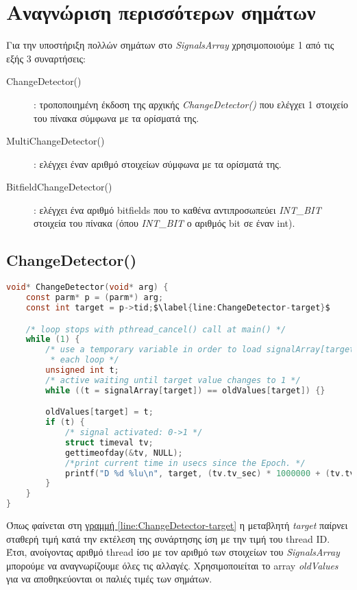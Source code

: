 \chapter{Αναγνώριση περισσότερων σημάτων}

Για την υποστήριξη πολλών σημάτων στο \textit{SignalsArray} χρησιμοποιούμε 1 από 
τις εξής 3 συναρτήσεις:
\begin{description}
	\item[ChangeDetector()]: τροποποιημένη έκδοση της αρχικής 
	\textit{ChangeDetector()} που ελέγχει 1 στοιχείο του πίνακα σύμφωνα με τα 
	ορίσματά της.
	\item[MultiChangeDetector()]: ελέγχει έναν αριθμό στοιχείων σύμφωνα με τα 
	ορίσματά της.
	\item[BitfieldChangeDetector()]: ελέγχει ένα αριθμό bitfields που το καθένα 
	αντιπροσωπεύει \textit{INT\_BIT} στοιχεία του πίνακα (όπου \textit{INT\_BIT} 
	ο 
	αριθμός bit σε έναν int).
\end{description}

\section{ChangeDetector()}

\begin{lstlisting}[language=c, caption={ChangeDetector()}, escapechar=$]
void* ChangeDetector(void* arg) {
    const parm* p = (parm*) arg;
    const int target = p->tid;$\label{line:ChangeDetector-target}$

    /* loop stops with pthread_cancel() call at main() */
    while (1) {
        /* use a temporary variable in order to load signalArray[target] once in
         * each loop */
        unsigned int t;
        /* active waiting until target value changes to 1 */
        while ((t = signalArray[target]) == oldValues[target]) {}

        oldValues[target] = t;
        if (t) {
            /* signal activated: 0->1 */
            struct timeval tv;
            gettimeofday(&tv, NULL);
            /*print current time in usecs since the Epoch. */
            printf("D %d %lu\n", target, (tv.tv_sec) * 1000000 + (tv.tv_usec));
        }
    }
}
\end{lstlisting}

Όπως φαίνεται στη \hyperref[line:ChangeDetector-target]{γραμμή 
\ref*{line:ChangeDetector-target}} η μεταβλητή \textit{target} παίρνει σταθερή 
τιμή κατά την εκτέλεση της συνάρτησης ίση με την τιμή του thread ID. Έτσι, 
ανοίγοντας αριθμό thread ίσο με τον αριθμό των στοιχείων του 
\textit{SignalsArray} μπορούμε να αναγνωρίζουμε όλες τις αλλαγές. Χρησιμοποιείται 
το array \textit{oldValues} για να αποθηκεύονται οι παλιές τιμές των σημάτων.

